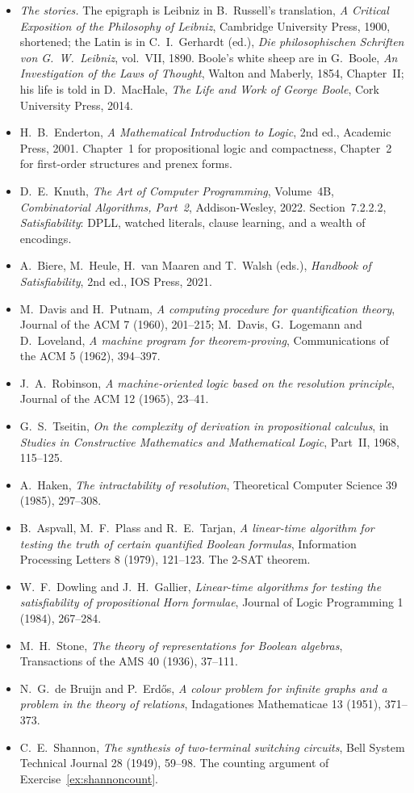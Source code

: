 \begin{itemize}
\item \emph{The stories.} The epigraph is Leibniz in B.~Russell's translation, \emph{A Critical Exposition of the Philosophy of Leibniz}, Cambridge University Press, 1900, shortened; the Latin
is in C.~I.~Gerhardt (ed.), \emph{Die philosophischen Schriften von G.~W.~Leibniz}, vol.~VII, 1890. Boole's white sheep are in G.~Boole, \emph{An Investigation of the Laws of Thought}, Walton and Maberly, 1854,
Chapter~II; his life is told in D.~MacHale, \emph{The Life and Work of George Boole}, Cork University Press, 2014.
\item H.~B.~Enderton, \emph{A Mathematical Introduction to Logic}, 2nd ed., Academic Press, 2001. Chapter~1 for propositional
logic and compactness, Chapter~2 for first-order structures and prenex forms.
\item D.~E.~Knuth, \emph{The Art of Computer Programming}, Volume~4B, \emph{Combinatorial Algorithms, Part~2}, Addison-Wesley,
2022. Section~7.2.2.2, \emph{Satisfiability}: DPLL, watched literals, clause learning, and a wealth of encodings.
\item A.~Biere, M.~Heule, H.~van Maaren and T.~Walsh (eds.), \emph{Handbook of Satisfiability}, 2nd ed., IOS Press, 2021.
\item M.~Davis and H.~Putnam, \emph{A computing procedure for quantification theory}, Journal of the ACM 7 (1960),
201--215; M.~Davis, G.~Logemann and D.~Loveland, \emph{A machine program for theorem-proving}, Communications of the
ACM 5 (1962), 394--397.
\item J.~A.~Robinson, \emph{A machine-oriented logic based on the resolution principle}, Journal of the ACM 12 (1965),
23--41.
\item G.~S.~Tseitin, \emph{On the complexity of derivation in propositional calculus}, in \emph{Studies in Constructive
Mathematics and Mathematical Logic}, Part~II, 1968, 115--125.
\item A.~Haken, \emph{The intractability of resolution}, Theoretical Computer Science 39 (1985), 297--308.
\item B.~Aspvall, M.~F.~Plass and R.~E.~Tarjan, \emph{A linear-time algorithm for testing the truth of certain quantified
Boolean formulas}, Information Processing Letters 8 (1979), 121--123. The 2-SAT theorem.
\item W.~F.~Dowling and J.~H.~Gallier, \emph{Linear-time algorithms for testing the satisfiability of propositional Horn
formulae}, Journal of Logic Programming 1 (1984), 267--284.
\item M.~H.~Stone, \emph{The theory of representations for Boolean algebras}, Transactions of the AMS 40 (1936), 37--111.
\item N.~G.~de Bruijn and P.~Erd\H os, \emph{A colour problem for infinite graphs and a problem in the theory of relations},
Indagationes Mathematicae 13 (1951), 371--373.
\item C.~E.~Shannon, \emph{The synthesis of two-terminal switching circuits}, Bell System Technical Journal 28 (1949),
59--98. The counting argument of Exercise~\ref{ex:shannoncount}.
\end{itemize}
